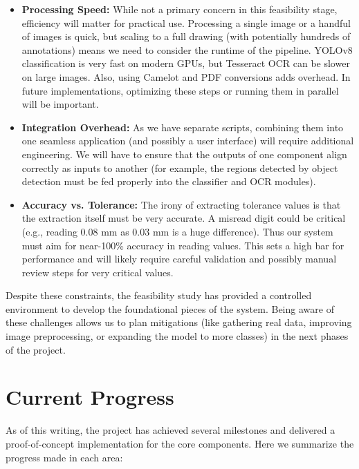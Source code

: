 \documentclass[11pt,a4paper]{article}
\begin{document}
\begin{itemize}
  \item \textbf{Processing Speed:} While not a primary concern in this feasibility stage, efficiency will matter for practical use. Processing a single image or a handful of images is quick, but scaling to a full drawing (with potentially hundreds of annotations) means we need to consider the runtime of the pipeline. YOLOv8 classification is very fast on modern GPUs, but Tesseract OCR can be slower on large images. Also, using Camelot and PDF conversions adds overhead. In future implementations, optimizing these steps or running them in parallel will be important.
  \item \textbf{Integration Overhead:} As we have separate scripts, combining them into one seamless application (and possibly a user interface) will require additional engineering. We will have to ensure that the outputs of one component align correctly as inputs to another (for example, the regions detected by object detection must be fed properly into the classifier and OCR modules).
  \item \textbf{Accuracy vs. Tolerance:} The irony of extracting tolerance values is that the extraction itself must be very accurate. A misread digit could be critical (e.g., reading 0.08 mm as 0.03 mm is a huge difference). Thus our system must aim for near-100\% accuracy in reading values. This sets a high bar for performance and will likely require careful validation and possibly manual review steps for very critical values.
\end{itemize}

Despite these constraints, the feasibility study has provided a controlled environment to develop the foundational pieces of the system. Being aware of these challenges allows us to plan mitigations (like gathering real data, improving image preprocessing, or expanding the model to more classes) in the next phases of the project.

\section{Current Progress}
As of this writing, the project has achieved several milestones and delivered a proof-of-concept implementation for the core components. Here we summarize the progress made in each area:
\end{document}
